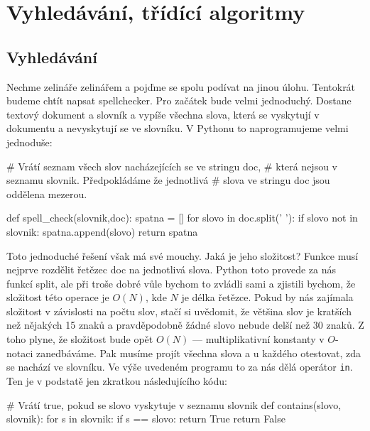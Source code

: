 \ifx\ucebnice\undefined

\setcounter{section}{2}
\fi
\section{Vyhledávání, třídící algoritmy}

\subsection*{Vyhledávání}
Nechme zelináře zelinářem a pojďme se spolu podívat na jinou úlohu. Tentokrát budeme chtít napsat spellchecker. Pro začátek bude
velmi jednoduchý. Dostane textový dokument a slovník a vypíše všechna slova, která se vyskytují v dokumentu a nevyskytují se
ve slovníku. V Pythonu to naprogramujeme velmi jednoduše:

\begin{python}
# Vrátí seznam všech slov nacházejících se ve stringu doc,
# která nejsou v seznamu slovnik. Předpokládáme že jednotlivá
# slova ve stringu doc jsou oddělena mezerou.

def spell_check(slovnik,doc):
  spatna = []
  for slovo in doc.split(' '):
    if slovo not in slovnik:
      spatna.append(slovo)
  return spatna
\end{python}

Toto jednoduché řešení však má své mouchy. Jaká je jeho složitost? Funkce musí nejprve rozdělit řetězec doc na jednotlivá slova.
Python toto provede za nás funkcí split, ale při troše dobré vůle bychom to zvládli sami a zjistili bychom, že složitost této
operace je $O(N)$, kde $N$ je délka řetězce. Pokud by nás zajímala složitost v závislosti na počtu slov, stačí si uvědomit, že
většina slov je kratších než nějakých 15 znaků a pravděpodobně žádné slovo nebude delší než 30 znaků. Z toho plyne, že složitost
bude opět $O(N)$ --- multiplikativní konstanty v $O$-notaci zanedbáváme. Pak musíme projít všechna slova a u každého otestovat,
zda se nachází ve slovníku. Ve výše uvedeném programu to za nás dělá operátor {\tt in}. Ten je v podstatě jen zkratkou
následujícího kódu:

\begin{python}
# Vrátí true, pokud se slovo vyskytuje v seznamu slovnik
def contains(slovo, slovnik):
  for s in slovnik:
    if s == slovo:
      return True
  return False
\end{python}

